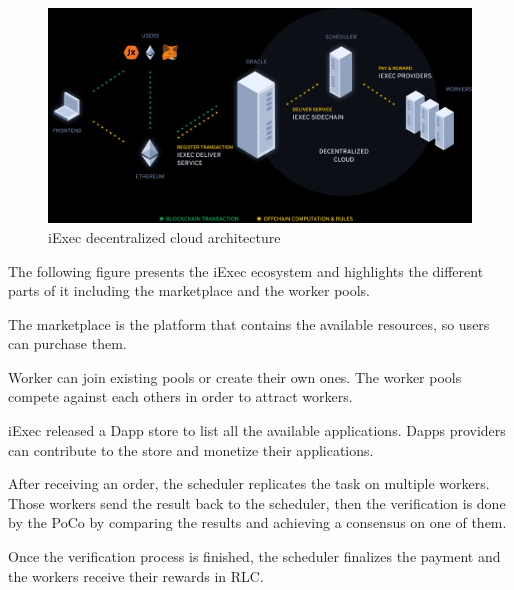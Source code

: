         \begin{landscape}
            \begin{figure}
                \includegraphics[width=\columnwidth]{4-Requirements/figs/iexec-decentralized-cloud.png}
                \caption{iExec decentralized cloud architecture}
            \end{figure}
        \end{landscape}

        The following figure\cite{iexec-marketplace} presents the iExec ecosystem and highlights the different parts of it
        including the marketplace and the worker pools.
        
        The marketplace is the platform that contains the available resources, so users can purchase them.
        
        Worker can join existing pools or create their own ones. The worker pools compete against each others
        in order to attract workers.

        iExec released a Dapp store to list all the available applications. Dapps providers can contribute to
        the store and monetize their applications.

        After receiving an order, the scheduler replicates the task on multiple workers. Those workers send
        the result back to the scheduler, then the verification is done by the PoCo by comparing the results
        and achieving a consensus on one of them.

        Once the verification process is finished, the scheduler finalizes the payment and the workers
        receive their rewards in RLC.

